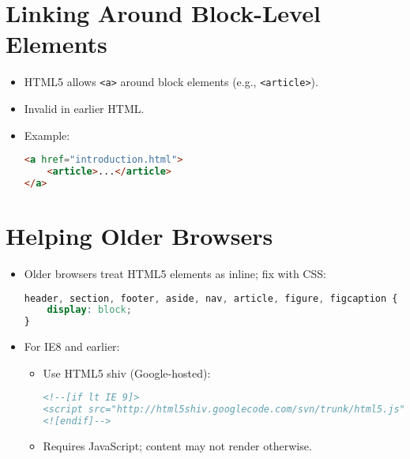 \documentclass[a4paper,11pt]{article}
\newcommand{\code}[1]{\texttt{#1}}
\begin{document}
\section{Linking Around Block-Level Elements}
\begin{itemize}
    \item HTML5 allows \code{<a>} around block elements (e.g., \code{<article>}).
    \item Invalid in earlier HTML.
    \item Example:
    \begin{lstlisting}[language=HTML]
<a href="introduction.html">
    <article>...</article>
</a>
    \end{lstlisting}
\end{itemize}

\section{Helping Older Browsers}
\begin{itemize}
    \item Older browsers treat HTML5 elements as inline; fix with CSS:
    \begin{lstlisting}[language=CSS]
header, section, footer, aside, nav, article, figure, figcaption {
    display: block;
}
    \end{lstlisting}
    \item For IE8 and earlier:
    \begin{itemize}
        \item Use HTML5 shiv (Google-hosted):
        \begin{lstlisting}[language=HTML]
<!--[if lt IE 9]>
<script src="http://html5shiv.googlecode.com/svn/trunk/html5.js"></script>
<![endif]-->
        \end{lstlisting}
        \item Requires JavaScript; content may not render otherwise.
    \end{itemize}
\end{itemize}

\end{document}
